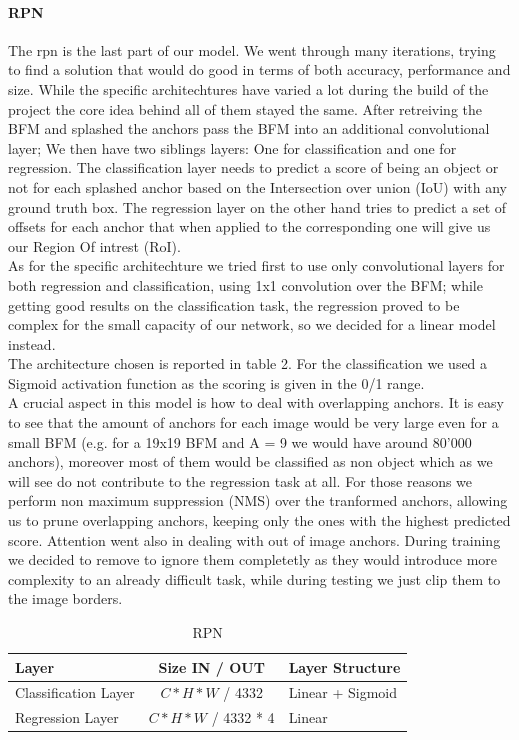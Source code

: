 \documentclass[10pt,journal,cspaper,compsoc]{IEEEtran}
\begin{document}
  \paragraph{RPN}
   The rpn is the last part of our model. We went through many iterations, trying to find a solution that would do good in terms of both accuracy, performance and size. While the specific architechtures have varied a lot during the build of the project the core idea behind all of them stayed the same. After retreiving the  BFM and splashed the anchors pass the BFM into an additional               convolutional layer; We then have two siblings layers: One for classification and one for regression. The classification layer needs to predict a score of being an object or not for each splashed anchor based on the Intersection over union (IoU) with any ground truth box. The regression layer on the other hand tries to predict a set of offsets for each anchor that when applied to the corresponding one will give us our Region Of intrest (RoI).\\ As for the specific architechture we tried first to use only convolutional layers for both regression and classification, using 1x1 convolution over the BFM; while getting good results on the classification task, the regression proved to be complex for the small capacity of our network, so we decided for a linear model instead. \\
The architecture chosen is reported in table 2. For the classification we used a Sigmoid activation function as the scoring is given  in the 0/1 range. \\ A crucial aspect in this model is how to deal with overlapping anchors. It is easy to see that the amount of anchors for each image would be very large even for a small BFM (e.g. for a 19x19 BFM and A = 9 we would have around 80'000 anchors), moreover most of them would be classified as non object which as we will see do not contribute to the regression task at all. For those reasons we perform non maximum suppression (NMS) over the tranformed anchors, allowing us to prune overlapping anchors, keeping only the ones with the highest predicted score. Attention went also in dealing with out of image anchors. During training we decided to remove to ignore them completetly as they would introduce more complexity to an already difficult task, while during testing we just clip them to the image borders.

    \begin{table}[htb]
        \caption{RPN}
        \label{tab:Table 2}
        \begin{tabularx}{.5\textwidth}{l | c |  l}  
            \textbf{Layer} & \textbf{Size IN / OUT} & \textbf{Layer Structure}\\
            \hline 
            Classification Layer &  $ C * H * W$ / 4332        & Linear + Sigmoid \\ 
            Regression Layer    &  $ C * H * W$ / 4332 * 4  & Linear \\
        \end{tabularx}
    \end{table}
    
\end{document}
